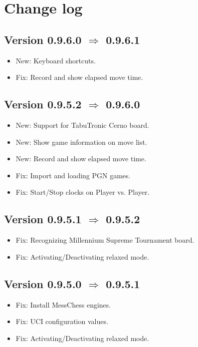 \documentclass[11pt,a4paper]{article}
\begin{document}
\pagebreak

\section{Change log}


\subsection*{Version 0.9.6.0 $\Rightarrow$  0.9.6.1}
\begin{itemize}
	\item {\color{blue}New}: Keyboard shortcuts.
	\item {\color{red}Fix}: Record and show elapsed move time.		
\end{itemize}


\subsection*{Version 0.9.5.2 $\Rightarrow$  0.9.6.0}
\begin{itemize}
	\item {\color{blue}New}: Support for TabuTronic Cerno board.
	\item {\color{blue}New}: Show game information on move list.	
	\item {\color{blue}New}: Record and show elapsed move time.		
	\item {\color{red}Fix}: Import and loading PGN games.
	\item {\color{red}Fix}: Start/Stop clocks on Player vs. Player.	
\end{itemize}


\subsection*{Version 0.9.5.1 $\Rightarrow$  0.9.5.2}
\begin{itemize}
	\item {\color{red}Fix}: Recognizing Millennium Supreme Tournament board.
	\item {\color{red}Fix}: Activating/Deactivating relaxed mode.
\end{itemize}

\subsection*{Version 0.9.5.0 $\Rightarrow$  0.9.5.1}
\begin{itemize}
	\item {\color{red}Fix}: Install MessChess engines.
	\item {\color{red}Fix}: UCI configuration values.
	\item {\color{red}Fix}: Activating/Deactivating relaxed mode.
\end{itemize}
\end{document}
